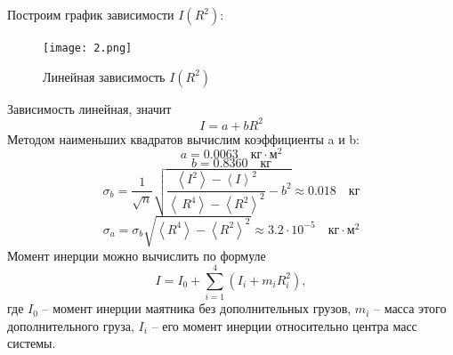\documentclass[a4paper,12pt]{article}
\begin{document}
\begin{enumerate}
    Построим график зависимости $I(R^2)$:
    \begin{figure}[h]
        \centering
        \texttt{[image: 2.png]}
        \caption{Линейная зависимость $I(R^2)$}
    \end{figure}

    Зависимость линейная, значит
    \begin{displaymath}
        I = a + b R^2
    \end{displaymath}
    Методом наименьших квадратов вычислим коэффициенты a и b:
    \begin{displaymath}
        a = 0.0063 \quad кг \cdot м^2
    \end{displaymath}
    \begin{displaymath}
        b = 0.8360 \quad кг
    \end{displaymath}
    \begin{displaymath}
        \sigma_b = \dfrac{1}{\sqrt{n}}\sqrt{\dfrac{\left\langle I^2 \right\rangle - \left\langle I \right\rangle^2}{\left\langle \
		R^4\right\rangle - \left\langle R^2\right\rangle^2} - b^2} \approx 0.018 \quad кг
    \end{displaymath}
    \begin{displaymath}
        \sigma_a = \sigma_b \sqrt{\left\langle R^4 \right\rangle - \left\langle R^2 \right\rangle ^2 } \approx 3.2 \cdot 10^{-5} \quad кг \cdot м^2
    \end{displaymath}
    Момент инерции можно вычислить по формуле 
    \begin{displaymath}
        I = I_0 + \sum\limits_{i = 1}^4{(I_i + m_iR_i^2)},
    \end{displaymath}
    где $I_0$ -- момент инерции маятника без дополнительных грузов, $m_i$ -- масса этого дополнительного груза, $I_i$ -- его момент инерции относительно центра масс системы.


\end{enumerate}
\end{document}
